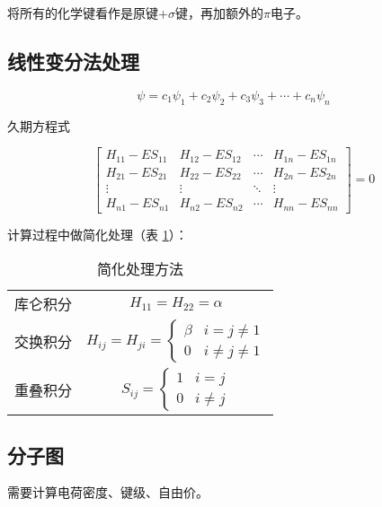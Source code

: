 将所有的化学键看作是原键+$\sigma$键，再加额外的$\pi$电子。


\subsection{线性变分法处理}


\begin{equation*}
    \psi = c_1 \psi_1 + c_2 \psi_2 + c_3 \psi_3 + \cdots + c_n \psi_n
\end{equation*}

久期方程式

\begin{equation*}
    \begin{bmatrix*}
        H_{11} - ES_{11} & H_{12} - ES_{12} & \cdots & H_{1n} - ES_{1n} \\
        H_{21} - ES_{21} & H_{22} - ES_{22} & \cdots & H_{2n} - ES_{2n} \\
        \vdots & \vdots & \ddots & \vdots \\
        H_{n1} - ES_{n1} & H_{n2} - ES_{n2} & \cdots & H_{nn} - ES_{nn}
    \end{bmatrix*} = 0
\end{equation*}

计算过程中做简化处理（表 \ref{tab:simplify}）：


\begin{table}[h]
    \centering
    \begin{tabular}{cc}
        库仑积分 & $H_{11} = H_{22} = \alpha$ \\ 
        交换积分 & $H_{ij} = H_{ji} = \begin{cases}
            \beta & i = j \neq 1 \\ 
            0 & i \neq j \neq 1
        \end{cases}$ \\
        重叠积分 & $S_{ij} = \begin{cases}
            1 & i = j \\ 
            0 & i \neq j
        \end{cases}$
    \end{tabular}
    \caption{简化处理方法}
    \label{tab:simplify}
\end{table}


\subsection{分子图}

需要计算电荷密度、键级、自由价。


